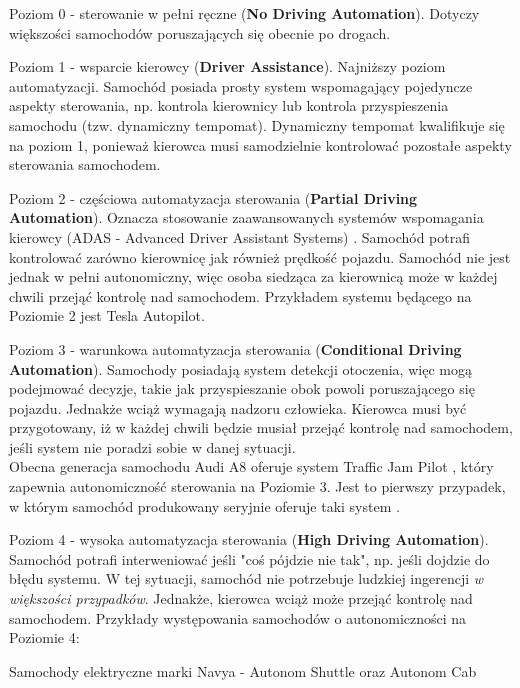 \begin{enumerate*}
\item Poziom 0 - sterowanie w pełni ręczne (\textbf{No Driving Automation}). Dotyczy większości samochodów poruszających się obecnie po drogach.
\item Poziom 1 - wsparcie kierowcy (\textbf{Driver Assistance}). Najniższy poziom automatyzacji. Samochód posiada prosty system wspomagający pojedyncze aspekty sterowania, np. kontrola kierownicy lub kontrola przyspieszenia samochodu (tzw. dynamiczny tempomat). 
Dynamiczny tempomat kwalifikuje się na poziom 1, ponieważ kierowca musi samodzielnie kontrolować pozostałe aspekty sterowania samochodem.
\item Poziom 2 - częściowa automatyzacja sterowania (\textbf{Partial Driving Automation}). Oznacza stosowanie zaawansowanych systemów wspomagania kierowcy (ADAS - Advanced Driver Assistant Systems) \cite{adas:opis}. Samochód potrafi kontrolować zarówno kierownicę jak również prędkość pojazdu. Samochód nie jest jednak w pełni autonomiczny, więc osoba siedząca za kierownicą może w każdej chwili przejąć kontrolę nad samochodem. Przykładem systemu będącego na Poziomie 2 jest Tesla Autopilot.
\item Poziom 3 - warunkowa automatyzacja sterowania (\textbf{Conditional Driving Automation}). Samochody posiadają system detekcji otoczenia, więc mogą podejmować decyzje, takie jak przyspieszanie obok powoli poruszającego się pojazdu. Jednakże wciąż wymagają nadzoru człowieka. Kierowca musi być przygotowany, iż w każdej chwili będzie musiał przejąć kontrolę nad samochodem, jeśli system nie poradzi sobie w danej sytuacji. \\
Obecna generacja samochodu Audi A8 oferuje system Traffic Jam Pilot \cite{audi:trafficJamPilot}, który zapewnia autonomiczność sterowania na Poziomie 3. Jest to pierwszy przypadek, w którym samochód produkowany seryjnie oferuje taki system \cite{audi:newAudiA8ConditionalAutomated}.
\item Poziom 4 - wysoka automatyzacja sterowania (\textbf{High Driving Automation}). Samochód potrafi interweniować jeśli "coś pójdzie nie tak", np. jeśli dojdzie do błędu systemu. W tej sytuacji, samochód nie potrzebuje ludzkiej ingerencji \textit{w większości przypadków}. Jednakże, kierowca wciąż może przejąć kontrolę nad samochodem. Przykłady występowania samochodów o autonomiczności na Poziomie 4:
\begin{itemize*}
\item Samochody elektryczne marki Navya - Autonom Shuttle oraz Autonom Cab \cite{motorAuthority:navyaCars}

\end{itemize*}
\end{enumerate*}
